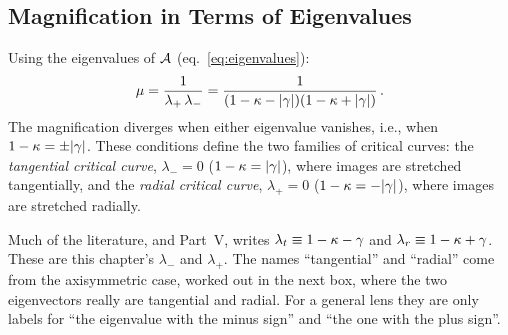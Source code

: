 \subsection{Magnification in Terms of Eigenvalues}

Using the eigenvalues of $\mathcal{A}$ (eq.~\ref{eq:eigenvalues}):
\begin{equation}
    \mu = \frac{1}{\lambda_+\,\lambda_-}
    = \frac{1}{(1 - \kappa - |\gamma|)(1 - \kappa + |\gamma|)} \,.
    \label{eq:mu_eigenvalues}
\end{equation}
The magnification diverges when either eigenvalue vanishes, i.e.,
when $1 - \kappa = \pm|\gamma|$.  These conditions define the two
families of critical curves: the \emph{tangential critical curve},
$\lambda_- = 0$ ($1 - \kappa = |\gamma|$), where images are stretched
tangentially, and the \emph{radial critical curve}, $\lambda_+ = 0$
($1 - \kappa = -|\gamma|$), where images are stretched radially.
\begin{annotation}
Much of the literature, and Part~V, writes
$\lambda_t \equiv 1 - \kappa - \gamma$ and $\lambda_r \equiv 1 - \kappa + \gamma$.
These are this chapter's $\lambda_-$ and $\lambda_+$. The names ``tangential'' and
``radial'' come from the axisymmetric case, worked out in the next box,
where the two eigenvectors really are tangential and radial. For a general lens they
are only labels for ``the eigenvalue with the minus sign'' and ``the one with the
plus sign''.
\end{annotation}
